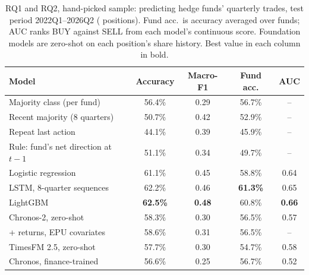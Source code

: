 \begin{table}[t]
  \caption{RQ1 and RQ2, hand-picked sample: predicting hedge funds' quarterly trades, test period
  2022Q1--2026Q2 (\testrowsM{} positions). Fund acc.\ is accuracy averaged over funds; AUC ranks
  BUY against SELL from each model's continuous score. Foundation models are zero-shot on each
  position's share history. Best value in each column in bold.}
  \label{tab:rq1}
  \small
  \setlength{\tabcolsep}{3pt}
  \begin{tabular}{@{}lcccc@{}}
    \toprule
    Model & Accuracy & Macro-F1 & Fund acc. & AUC \\
    \midrule
    Majority class (per fund) & 56.4\% & 0.29 & 56.7\% & -- \\
    Recent majority (8 quarters) & 50.7\% & 0.42 & 52.9\% & -- \\
    Repeat last action & 44.1\% & 0.39 & 45.9\% & -- \\
    Rule: fund's net direction at $t-1$ & 51.1\% & 0.34 & 49.7\% & -- \\
    Logistic regression & 61.1\% & 0.45 & 58.8\% & 0.64 \\
    LSTM, 8-quarter sequences & 62.2\% & 0.46 & \textbf{61.3\%} & 0.65 \\
    LightGBM & \textbf{62.5\%} & \textbf{0.48} & 60.8\% & \textbf{0.66} \\
    \midrule
    Chronos-2, zero-shot & 58.3\% & 0.30 & 56.5\% & 0.57 \\
    \quad + returns, EPU covariates & 58.6\% & 0.31 & 56.5\% & -- \\
    TimesFM 2.5, zero-shot & 57.7\% & 0.30 & 54.7\% & 0.58 \\
    Chronos, finance-trained & 56.6\% & 0.25 & 56.7\% & 0.52 \\
    \bottomrule
  \end{tabular}
\end{table}
